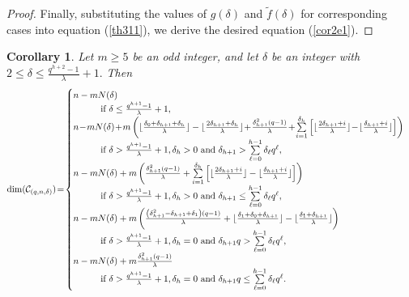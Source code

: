 \documentclass[journal,onecolumn]{IEEEtran}
\newtheorem{Corollary}{Corollary}
\begin{document}
\begin{proof}
 Finally, substituting the values of $g(\delta)$ and $\widetilde{f}(\delta)$ for corresponding cases into equation   (\ref{th311}), we derive the desired equation (\ref{cor2e1}). 
  \end{proof}  
 
\begin{Corollary}\label{hlx}
     Let $m\geq 5$ be an odd integer, and let $\delta$  be an integer with $2\leq \delta \leq  \frac{q^{h+2}-1}{\lambda}+1.$    Then  
\begin{equation}\label{cor3e0}
           \mathrm{dim}(\mathcal{C}_{(q,n,\delta)})\! = \!
           \begin{cases} 
           n-mN(\delta)\\
           \quad \quad\quad \hbox{if }\delta \leq \frac{q^{h+1}-1}{\lambda}+1,\\
            n\!-\!mN(\delta)\!+\!m \left(\lfloor\frac{\delta_0+\delta_{h+1}+\delta_h}{\lambda} \rfloor - \lfloor\frac{2\delta_{h+1}+\delta_h}{\lambda} \rfloor
           \!+\! \frac{\delta_{h+1}^2(q-1)}{\lambda}\!+\!\sum\limits_{i=1}^{\delta_h}\left[\lfloor \frac{2\delta_{h+1}+i}{\lambda}\rfloor \!-\! \lfloor \frac{\delta_{h+1}+i}{\lambda}\rfloor \right] \right)  \\
           \quad \quad \quad 
                \hbox{if } \delta> \frac{q^{h+1}-1}{\lambda}+1,  \delta_h>0  \hbox{ and }\delta_{h+1}> \sum\limits_{\ell=0}^{h-1}\delta_{\ell}q^{\ell},\\
            n-mN(\delta)+m \left(\frac{\delta_{h+1}^2(q-1)}{\lambda} +\sum\limits_{i=1}^{\delta_h}\left[\lfloor \frac{2\delta_{h+1}+i}{\lambda}\rfloor - \lfloor \frac{\delta_{h+1}+i}{\lambda}\rfloor \right]\right)
             \\ \quad \quad \quad   \hbox{if } \delta> \frac{q^{h+1}-1}{\lambda}+1,  \delta_h>0  \hbox{ and }\delta_{h+1}\leq  \sum\limits_{\ell=0}^{h-1}\delta_{\ell}q^{\ell},\\
n-mN(\delta)+m\left(\frac{\left(\delta_{h+1}^2-\delta_{h+1}+\delta_1\right)(q-1)}{\lambda}+\lfloor \frac{\delta_1+\delta_0+\delta_{h+1}}{\lambda}\rfloor -\lfloor \frac{\delta_1+\delta_{h+1}}{\lambda}\rfloor\right)\\
\quad \quad \quad  \hbox{if
      }\delta> \frac{q^{h+1}-1}{\lambda}+1, \delta_h=0 \hbox{ and }\delta_{h+1}q>\sum\limits_{\ell=0}^{h-1}\delta_{\ell}q^{\ell},\\
   n-mN(\delta) +m   \frac{\delta_{h+1}^2(q-1)}{\lambda} \\ \quad \quad \quad  \hbox{if
      }\delta> \frac{q^{h+1}-1}{\lambda}+1, \delta_h=0 \hbox{ and } \delta_{h+1}q\leq \sum\limits_{\ell=0}^{h-1}\delta_{\ell}q^{\ell}.
     \end{cases}
 \end{equation}
\end{Corollary}
\end{document}

